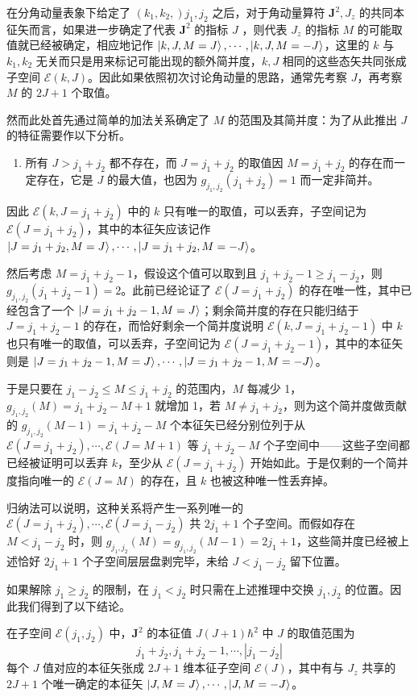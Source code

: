 \documentclass[cn,10pt,math=newtx,citestyle=gb7714-2015,bibstyle=gb7714-2015]{elegantbook}
\def\bm{\boldsymbol}
\def\ms{\mathscr}
\begin{document}
在分角动量表象下给定了 $(k_1,k_2,)j_1,j_2$ 之后，对于角动量算符 $\bm J^2,J_z$ 的共同本征矢而言，如果进一步确定了代表 $\bm J^2$ 的指标 $J$ ，则代表 $J_z$ 的指标 $M$ 的可能取值就已经被确定，相应地记作 $\ket{k,J,M=J},\cdots,\ket{k,J,M=-J}$，这里的 $k$ 与 $k_1,k_2$ 无关而只是用来标记可能出现的额外简并度，$k,J$ 相同的这些态矢共同张成子空间 $\ms E(k,J)$。因此如果依照初次讨论角动量的思路，通常先考察 $J$，再考察 $M$ 的 $2J+1$ 个取值。

然而此处首先通过简单的加法关系确定了 $M$ 的范围及其简并度：为了从此推出 $J$ 的特征需要作以下分析。
\begin{enumerate}
    \item 所有 $J>j_1+j_2$ 都不存在，而 $J=j_1+j_2$ 的取值因 $M=j_1+j_2$ 的存在而一定存在，它是 $J$ 的最大值，也因为 $g_{j_1,j_2}(j_1+j_2)=1$ 而一定非简并。
\end{enumerate}

因此 $\ms E(k,J=j_1+j_2)$ 中的 $k$ 只有唯一的取值，可以丢弃，子空间记为 $\ms E(J=j_1+j_2)$，其中的本征矢应该记作 $\ket{J=j_1+j_2,M=J},\cdots,\ket{J = j_1+j_2,M=-J}$。

然后考虑 $M = j_1+j_2-1$，假设这个值可以取到且 $j_1+j_2-1\ge j_1-j_2$，则 $g_{j_1,j_2}(j_1+j_2-1)=2$。此前已经论证了 $\ms E(J=j_1+j_2)$ 的存在唯一性，其中已经包含了一个 $\ket{J=j_1+j_2-1,M=J}$；剩余简并度的存在只能归结于 $J=j_1+j_2-1$ 的存在，而恰好剩余一个简并度说明 $\ms E(k,J=j_1+j_2-1)$ 中 $k$ 也只有唯一的取值，可以丢弃，子空间记为 $\ms E(J=j_1+j_2-1)$，其中的本征矢则是 $\ket{J=j_1+j_2-1,M=J},\cdots,\ket{J=j_1+j_2-1,M=-J}$。

于是只要在 $j_1-j_2\le M\le j_1+j_2$ 的范围内，$M$ 每减少 1，$g_{j_1,j_2}(M)=j_1+j_2-M+1$ 就增加 1，若 $M\ne j_1+j_2$，则为这个简并度做贡献的 $g_{j_1,j_2}(M-1)=j_1+j_2-M$ 个本征矢已经分别位列于从 $\ms E(J=j_1+j_2),\cdots,\ms E(J=M+1)$ 等 $j_1+j_2-M$ 个子空间中——这些子空间都已经被证明可以丢弃 $k$，至少从 $\ms E(J=j_1+j_2)$ 开始如此。于是仅剩的一个简并度指向唯一的 $\ms E(J=M)$ 的存在，且 $k$ 也被这种唯一性丢弃掉。

归纳法可以说明，这种关系将产生一系列唯一的 $\ms E(J=j_1+j_2),\cdots,\ms E(J=j_1-j_2)$ 共 $2j_1+1$ 个子空间。而假如存在 $M<j_1-j_2$ 时，则 $g_{j_1,j_2}(M)=g_{j_1,j_2}(M-1)=2j_1+1$，这些简并度已经被上述恰好 $2j_1+1$ 个子空间层层盘剥完毕，未给 $J<j_1-j_2$ 留下位置。

如果解除 $j_1\ge j_2$ 的限制，在 $j_1<j_2$ 时只需在上述推理中交换 $j_1,j_2$ 的位置。因此我们得到了以下结论。

\begin{theorem}[$\bm J^2$ 的本征值及其本征子空间]
   在子空间 $\ms E(j_1,j_2)$ 中，$\bm J^2$ 的本征值 $J(J+1)\hbar^2$ 中 $J$ 的取值范围为
   \begin{equation}
       j_1+j_2,j_1+j_2-1,\cdots,|j_1-j_2|
   \end{equation}
   每个 $J$ 值对应的本征矢张成 $2J+1$ 维本征子空间 $\ms E(J)$，其中有与 $J_z$ 共享的 $2J+1$ 个唯一确定的本征矢 $\ket{J,M=J},\cdots,\ket{J,M=-J}$。
\end{theorem}
\end{document}
